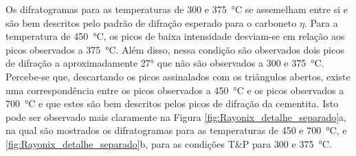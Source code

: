 Os difratogramas para as temperaturas de 300 e \SI{375}{\degreeCelsius} se assemelham entre si e são bem descritos pelo padrão de difração esperado para o carboneto $\eta$. Para a temperatura de \SI{450}{\degreeCelsius}, os picos de baixa intensidade desviam-se em relação aos picos observados a \SI{375}{\degreeCelsius}. Além disso, nessa condição são observados dois picos de difração a aproximadamente 27° que não são observados a 300 e \SI{375}{\degreeCelsius}. Percebe-se que, descartando os picos assinalados com os triângulos abertos, existe uma correspondência entre os picos observados a \SI{450}{\degreeCelsius} e os picos observados a \SI{700}{\degreeCelsius} e que estes são bem descritos pelos picos de difração da cementita. Isto pode ser observado mais claramente na Figura \ref{fig:Rayonix_detalhe_separado}a, na qual são mostrados os difratogramas para as temperaturas de 450 e \SI{700}{\degreeCelsius}, e \ref{fig:Rayonix_detalhe_separado}b, para as condições T\&P para 300 e \SI{375}{\degreeCelsius}.

